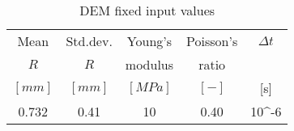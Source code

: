 \begin{table}[h]
\centering
\begin{tabular}{ccccc}
\hline
    Mean & Std.dev.  & Young's & Poisson's & $\Delta t$\\
    $R$ & $R$ & modulus & ratio & \\
    $[mm]$  & $[mm]$  & $[MPa]$ & $[-]$ & [s]\\
    \hline
    0.732 & 0.41 & 10    & 0.40 & 10^{-6}\\


\hline
\end{tabular}
\caption{DEM fixed input values}
\label{tab:09DEMFixedinputvalues}
\end{table}